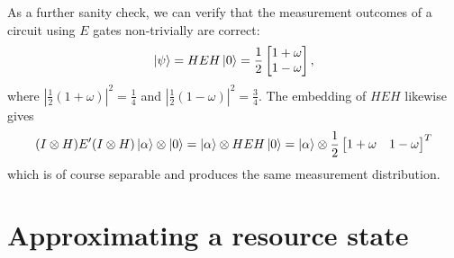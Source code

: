 \documentclass{article}
\begin{document}
As a further sanity check, we can verify that the measurement outcomes of a circuit using $E$ gates non-trivially are correct:
\[
	\ket{\psi} = HEH\ket{0} = \frac{1}{2}\begin{bmatrix} 1 + \omega \\ 1 - \omega \end{bmatrix},
\]
where $|\frac{1}{2}(1 + \omega)|^2 = \frac{1}{4}$ and $|\frac{1}{2}(1 - \omega)|^2 = \frac{3}{4}$. The embedding of $HEH$ likewise gives
\[
	(I\otimes H)E'(I\otimes H)\ket{\alpha}\otimes\ket{0} 
		= \ket{\alpha}\otimes HEH\ket{0} 
		= \ket{\alpha} \otimes \frac{1}{2}\begin{bmatrix} 1 + \omega & 1 - \omega \end{bmatrix}^T
\]
which is of course separable and produces the same measurement distribution.

\section{Approximating a resource state}
\end{document}
